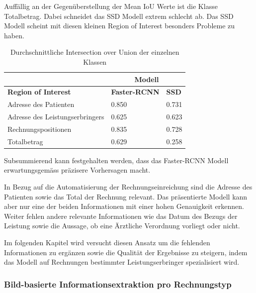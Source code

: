 Auffällig an der Gegenüberstellung der Mean IoU Werte ist die Klasse Totalbetrag. Dabei schneidet das SSD Modell extrem schlecht ab. Das SSD Modell scheint mit diesen kleinen Region of Interest besonders Probleme zu haben.

\begin{table}[h!]
    \centering
    \captionsetup{width=.9\linewidth}
    \caption{Durchschnittliche Intersection over Union der einzelnen Klassen}
    \label{tab:3ap-iou}
    \begin{tabular}{|l|l|l|}
    \hhline{~|--|}    
    \multicolumn{1}{c|}{}
                                    & \multicolumn{2}{c|}{\cellcolor[HTML]{C0E5FD}\textbf{Modell}}  \\
    \hline
    \rowcolor[HTML]{C0E5FD}
    \textbf{Region of Interest}     & \textbf{Faster-RCNN} & \textbf{SSD}           \\
    \hline
    Adresse des Patienten           & 0.850       & 0.731         \\
    \hline
    Adresse des Leistungserbringers & 0.625       & 0.623         \\
    \hline
    Rechnungspositionen             & 0.835       & 0.728         \\
    \hline
    Totalbetrag                     & 0.629       & 0.258         \\  
    \hline
    \end{tabular}
\end{table}

Subsummierend kann festgehalten werden, dass das Faster-RCNN Modell erwartungsgemäss präzisere Vorhersagen macht. 

In Bezug auf die Automatisierung der Rechnungseinreichung sind die Adresse des Patienten sowie das Total der Rechnung relevant. Das präsentierte Modell kann aber nur eine der beiden Informationen mit einer hohen Genauigkeit erkennen. Weiter fehlen andere relevante Informationen wie das Datum des Bezugs der Leistung sowie die Aussage, ob eine Ärztliche Verordnung vorliegt oder nicht. 

Im folgenden Kapitel wird versucht diesen Ansatz um die fehlenden Informationen zu ergänzen sowie die Qualität der Ergebnisse zu steigern, indem das Modell auf Rechnungen bestimmter Leistungserbringer spezialisiert wird.

\subsubsection{Bild-basierte Informationsextraktion pro Rechnungstyp}
\label{chap:lerb-specific-ie}

